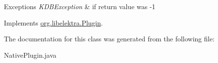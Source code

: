 \begin{DoxyExceptions}{Exceptions}
{\em K\+D\+B\+Exception} & if return value was -\/1 \\
\hline
\end{DoxyExceptions}


Implements \hyperlink{interfaceorg_1_1libelektra_1_1Plugin_a650ce789086f5becf21c5f91fad4c42e}{org.\+libelektra.\+Plugin}.



The documentation for this class was generated from the following file\+:\begin{DoxyCompactItemize}
\item 
Native\+Plugin.\+java\end{DoxyCompactItemize}
